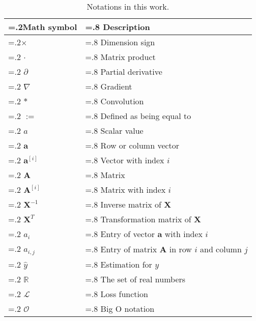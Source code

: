 \begin{table}[H]
\centering
\caption{Notations in this work.\label{tab:notation}}
\begin{tabularx}{\textwidth}{|
 >{\hsize=.2\hsize}X |
 >{\hsize=.8\hsize}X |
}
\hline
\textbf{Math symbol} & \textbf{Description} \\ \hline
$\times$ & Dimension sign \\ \hline
$\cdot$ & Matrix product \\ \hline
$\partial$ & Partial derivative \\ \hline
$\nabla$ & Gradient \\ \hline
$\ast$ & Convolution \\ \hline
$:=$ & Defined as being equal to \\ \hline
$a$ & Scalar value \\ \hline 
$\mathbf{a}$ & Row or column vector \\ \hline
$\mathbf{a}^{[i]}$ & Vector with index $i$  \\ \hline
$\mathbf{A}$ & Matrix \\ \hline 
$\mathbf{A}^{[i]}$ & Matrix with index $i$ \\ \hline 
$\mathbf{X}^{-1}$ & Inverse matrix of $\mathbf{X}$ \\ \hline 
$\mathbf{X}^{T}$ & Transformation matrix of $\mathbf{X}$ \\ \hline 
$a_i$ & Entry of vector $\mathbf{a}$ with index $i$ \\ \hline 
$a_{i,j}$ & Entry of matrix $\mathbf{A}$ in row $i$ and column $j$ \\ \hline
$\hat{y}$ & Estimation for $y$ \\ \hline 
$\mathbb{R}$ & The set of real numbers \\ \hline
$\mathcal{L}$ & Loss function \\ \hline
$\mathcal{O}$ & Big O notation \\ \hline
\end{tabularx}
\end{table}

